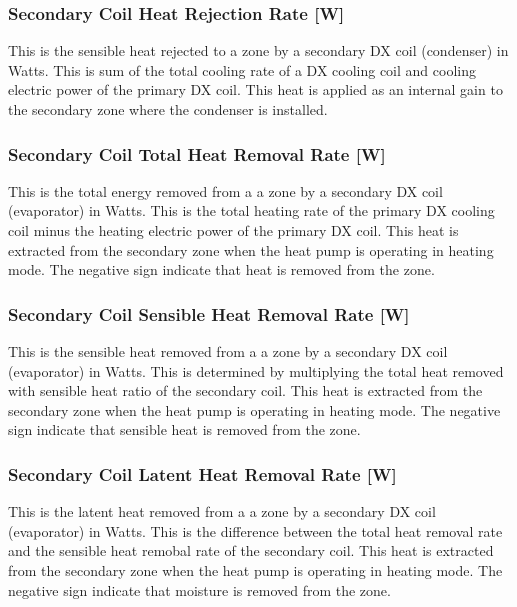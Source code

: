 \subsubsection{Secondary Coil Heat Rejection Rate {[}W{]}}\label{secondary-coil-heat-rejection-rate-w}

This is the sensible heat rejected to a zone by a secondary DX coil (condenser) in Watts. This is sum of the total cooling rate of a DX cooling coil and cooling electric power of the primary DX coil. This heat is applied as an internal gain to the secondary zone where the condenser is installed.

\subsubsection{Secondary Coil Total Heat Removal Rate {[}W{]}}\label{secondary-coil-total-heat-removal-rate-w}

This is the total energy removed from a a zone by a secondary DX coil (evaporator) in Watts. This is the total heating rate of the primary DX cooling coil minus the heating electric power of the primary DX coil. This heat is extracted from the secondary zone when the heat pump is operating in heating mode. The negative sign indicate that heat is removed from the zone.

\subsubsection{Secondary Coil Sensible Heat Removal Rate {[}W{]}}\label{secondary-coil-sensible-heat-removal-rate-w}

This is the sensible heat removed from a a zone by a secondary DX coil (evaporator) in Watts. This is determined by multiplying the total heat removed with sensible heat ratio of the secondary coil. This heat is extracted from the secondary zone when the heat pump is operating in heating mode. The negative sign indicate that sensible heat is removed from the zone.

\subsubsection{Secondary Coil Latent Heat Removal Rate {[}W{]}}\label{secondary-coil-latent-heat-removal-rate-w}

This is the latent heat removed from a a zone by a secondary DX coil (evaporator) in Watts. This is the difference between the total heat removal rate and the sensible heat remobal rate of the secondary coil. This heat is extracted from the secondary zone when the heat pump is operating in heating mode. The negative sign indicate that moisture is removed from the zone.


